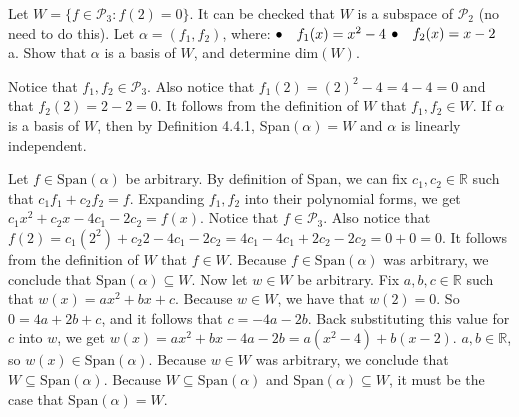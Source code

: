 \documentclass[12pt]{article}
\newenvironment{problem}[2][Problem]
{
	\begin{trivlist} 
		\item[\hskip \labelsep {\bfseries #1 #2:}]
	}
{
	\end{trivlist}
	}
\newenvironment{solution}[1][Solution]
{
	\begin{trivlist} 
		\item[\hskip \labelsep {\itshape #1:}]
	}
	{
	\end{trivlist}
}
\begin{document}
\newpage
\begin{problem}{3}
Let $W = \{ f\in \mathcal{P}_3:f(2)=0\}$. It can be checked that $W$ is a subspace of $\mathcal{P}_2$ (no need to do this). Let $\alpha = (f_1,f_2)$, where:
\newline
\newline
$\bullet \hphantom{10} f_1 (x) = x^2 -4$
\newline
\newline
$\bullet \hphantom{10} f_2 (x) = x -2$
\noindent
\newline
\newline
a. Show that $\alpha$ is a basis of $W$, and determine dim$(W)$.
\begin{solution}
Notice that $f_1,f_2 \in \mathcal{P}_3$. Also notice that $f_1(2) = (2)^2 -4 = 4-4 =0$ and that $f_2 (2) = 2-2 =0$. It follows from the definition of $W$ that $f_1,f_2 \in W$. If $\alpha$ is a basis of $W$, then by Definition 4.4.1, Span$(\alpha)=W$ and $\alpha$ is linearly independent.

Let $f \in \text{Span}(\alpha)$ be arbitrary. By definition of Span, we can fix $c_1,c_2 \in \mathbb{R}$ such that $c_1 f_1 + c_2 f_2 = f$. Expanding $f_1,f_2$ into their polynomial forms, we get $c_1x^2 +c_2 x -4c_1-2c_2=f(x)$. Notice that $f \in \mathcal{P}_3$. Also notice that $f(2) = c_1 (2^2) + c_2 2 -4c_1 - 2c_2 = 4c_1 -4c_1 + 2c_2 -2c_2 = 0 + 0 =0$. It follows from the definition of $W$ that $f\in W$. Because $f \in \text{Span}(\alpha)$ was arbitrary, we conclude that $\text{Span}(\alpha) \subseteq W$. Now let $w \in W$ be arbitrary. Fix $a,b,c \in \mathbb{R}$ such that $w(x) = ax^2 + bx + c$. Because $w \in W$, we have that $w(2) = 0$. So $0 = 4a +2b +c$, and it follows that $c=-4a-2b$. Back substituting this value for $c$ into $w$, we get $w(x) = ax^2 + bx -4a -2b = a(x^2 - 4) + b(x-2)$. $a,b \in \mathbb{R}$, so $w(x) \in \text{Span}(\alpha)$. Because $w \in W$ was arbitrary, we conclude that $W \subseteq \text{Span}(\alpha)$. Because $W \subseteq \text{Span}(\alpha)$ and $\text{Span}(\alpha) \subseteq W$, it must be the case that $\text{Span}(\alpha)=  W$.


\end{solution}
\end{problem}
\end{document}
